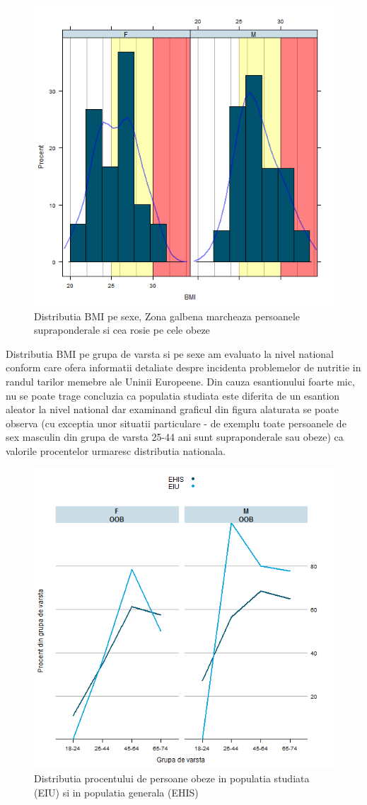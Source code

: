 \documentclass[11pt,draft]{article}
\begin{document}
    \begin{figure}[H]
	\centering
	\includegraphics[width=0.8\linewidth]{incobmiDens}
	\caption{Distributia BMI pe sexe, Zona galbena marcheaza persoanele supraponderale si cea rosie pe cele obeze}
	\label{fig:incobmiDens}
    \end{figure}
  Distributia BMI pe grupa de varsta si pe sexe am evaluato la nivel national conform \citep{EHIS09} care ofera informatii detaliate despre incidenta problemelor de nutritie in randul tarilor memebre ale Uninii Europeene. Din cauza esantionului foarte mic, nu se poate trage concluzia ca populatia studiata este diferita de un esantion aleator la nivel national dar examinand graficul din figura alaturata se poate observa (cu exceptia unor situatii particulare - de exemplu toate persoanele de sex masculin din grupa de varsta 25-44 ani sunt supraponderale sau obeze) ca valorile procentelor urmaresc distributia nationala.
  \begin{figure}[H]
	\centering
	\includegraphics[width=0.8\linewidth]{incoBMIvsEHIS-OOB}
	\caption{Distributia procentului de persoane obeze in populatia studiata (EIU) si in populatia generala (EHIS) }
	\label{fig:incoBMIvsEHIS-OOB}
  \end{figure}
  
\end{document}
